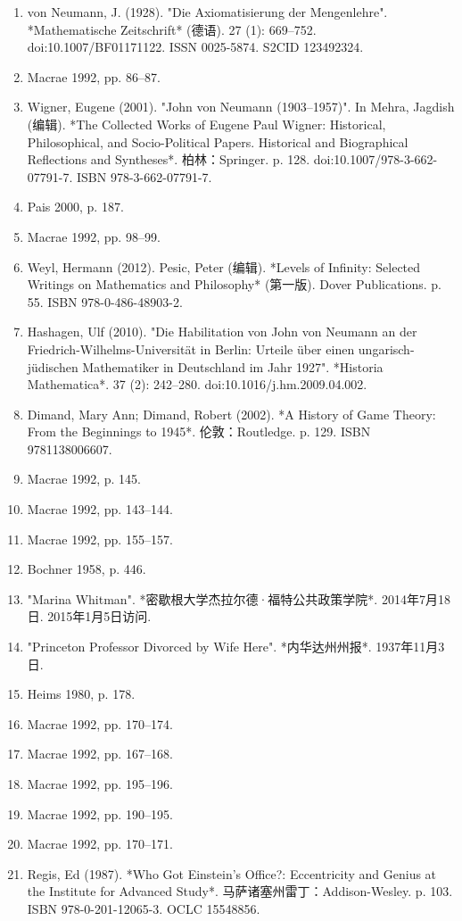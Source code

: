 \begin{enumerate}
\item von Neumann, J. (1928). "Die Axiomatisierung der Mengenlehre". *Mathematische Zeitschrift* (德语). 27 (1): 669–752. doi:10.1007/BF01171122. ISSN 0025-5874. S2CID 123492324.  
\item Macrae 1992, pp. 86–87.  
\item Wigner, Eugene (2001). "John von Neumann (1903–1957)". In Mehra, Jagdish (编辑). *The Collected Works of Eugene Paul Wigner: Historical, Philosophical, and Socio-Political Papers. Historical and Biographical Reflections and Syntheses*. 柏林：Springer. p. 128. doi:10.1007/978-3-662-07791-7. ISBN 978-3-662-07791-7.  
\item Pais 2000, p. 187.  
\item Macrae 1992, pp. 98–99.  
\item Weyl, Hermann (2012). Pesic, Peter (编辑). *Levels of Infinity: Selected Writings on Mathematics and Philosophy* (第一版). Dover Publications. p. 55. ISBN 978-0-486-48903-2.  
\item Hashagen, Ulf (2010). "Die Habilitation von John von Neumann an der Friedrich-Wilhelms-Universität in Berlin: Urteile über einen ungarisch-jüdischen Mathematiker in Deutschland im Jahr 1927". *Historia Mathematica*. 37 (2): 242–280. doi:10.1016/j.hm.2009.04.002.  
\item Dimand, Mary Ann; Dimand, Robert (2002). *A History of Game Theory: From the Beginnings to 1945*. 伦敦：Routledge. p. 129. ISBN 9781138006607.  
\item Macrae 1992, p. 145.  
\item Macrae 1992, pp. 143–144.  
\item Macrae 1992, pp. 155–157.  
\item Bochner 1958, p. 446.  
\item "Marina Whitman". *密歇根大学杰拉尔德·福特公共政策学院*. 2014年7月18日. 2015年1月5日访问.  
\item "Princeton Professor Divorced by Wife Here". *内华达州州报*. 1937年11月3日.  
\item Heims 1980, p. 178.  
\item Macrae 1992, pp. 170–174.  
\item Macrae 1992, pp. 167–168.  
\item Macrae 1992, pp. 195–196.  
\item Macrae 1992, pp. 190–195.  
\item Macrae 1992, pp. 170–171.  
\item Regis, Ed (1987). *Who Got Einstein's Office?: Eccentricity and Genius at the Institute for Advanced Study*. 马萨诸塞州雷丁：Addison-Wesley. p. 103. ISBN 978-0-201-12065-3. OCLC 15548856.  

\end{enumerate}
